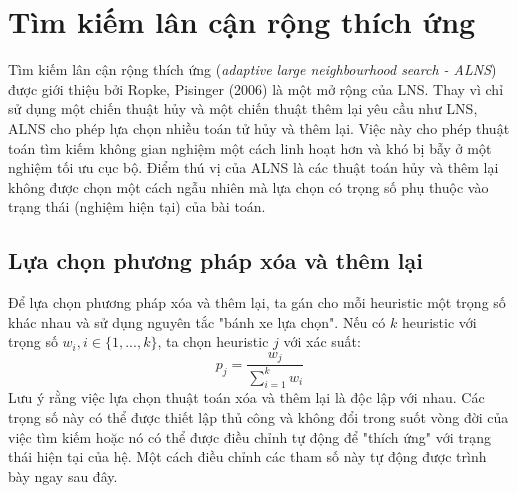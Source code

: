\section{Tìm kiếm lân cận rộng thích ứng}
Tìm kiếm lân cận rộng thích ứng (\textit{adaptive large neighbourhood search - ALNS}) được giới thiệu bởi Ropke, Pisinger (2006) \cite{ropke2006adaptive} là một mở rộng của LNS. Thay vì chỉ sử dụng một chiến thuật hủy và một chiến thuật thêm lại yêu cầu như LNS, ALNS cho phép lựa chọn nhiều toán tử hủy và thêm lại. Việc này cho phép thuật toán tìm kiếm không gian nghiệm một cách linh hoạt hơn và khó bị bẫy ở một nghiệm tối ưu cục bộ. Điểm thú vị của ALNS là các thuật toán hủy và thêm lại không được chọn một cách ngẫu nhiên mà lựa chọn có trọng số phụ thuộc vào trạng thái (nghiệm hiện tại) của bài toán.

\subsection{Lựa chọn phương pháp xóa và thêm lại}
Để lựa chọn phương pháp xóa và thêm lại, ta gán cho mỗi heuristic một trọng số khác nhau và sử dụng nguyên tắc "bánh xe lựa chọn". Nếu có $k$ heuristic với trọng số $w_i, i \in \{1,...,k\}$, ta chọn heuristic $j$ với xác suất:
\begin{equation}
  \label{eq:select}
  p_j = \frac{w_j}{\sum_{i=1}^k w_i}
\end{equation}
Lưu ý rằng việc lựa chọn thuật toán xóa và thêm lại là độc lập với nhau. Các trọng số này có thể được thiết lập thủ công và không đổi trong suốt vòng đời của việc tìm kiếm hoặc nó có thể được điều chỉnh tự động để "thích ứng" với trạng thái hiện tại của hệ. Một cách điều chỉnh các tham số này tự động được trình bày ngay sau đây.

